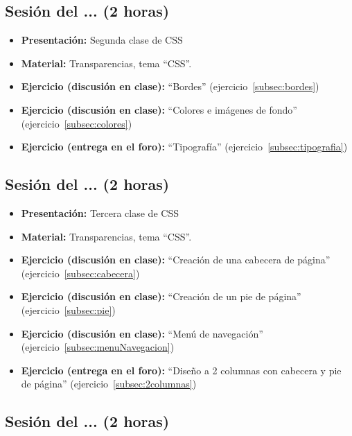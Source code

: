 \documentclass[a4paper,12pt]{report}
\begin{document}
\subsection{Sesión del ... (2 horas)}

\begin{itemize}
\item \textbf{Presentación:} Segunda clase de CSS
\item \textbf{Material:} Transparencias, tema ``CSS''.
\item \textbf{Ejercicio (discusión en clase):} ``Bordes'' (ejercicio~\ref{subsec:bordes})
\item \textbf{Ejercicio (discusión en clase):} ``Colores e imágenes de fondo'' (ejercicio~\ref{subsec:colores})
\item \textbf{Ejercicio (entrega en el foro):} ``Tipografía'' (ejercicio~\ref{subsec:tipografia})
\end{itemize}


\subsection{Sesión del ... (2 horas)}

\begin{itemize}
\item \textbf{Presentación:} Tercera clase de CSS
\item \textbf{Material:} Transparencias, tema ``CSS''.
\item \textbf{Ejercicio (discusión en clase):} ``Creación de una cabecera de página'' (ejercicio~\ref{subsec:cabecera})
\item \textbf{Ejercicio (discusión en clase):} ``Creación de un pie de página'' (ejercicio~\ref{subsec:pie})
\item \textbf{Ejercicio (discusión en clase):} ``Menú de navegación'' (ejercicio~\ref{subsec:menuNavegacion})
\item \textbf{Ejercicio (entrega en el foro):} ``Diseño a 2 columnas con cabecera y pie de página'' (ejercicio~\ref{subsec:2columnas})
\end{itemize}

\subsection{Sesión del ... (2 horas)}
\end{document}
